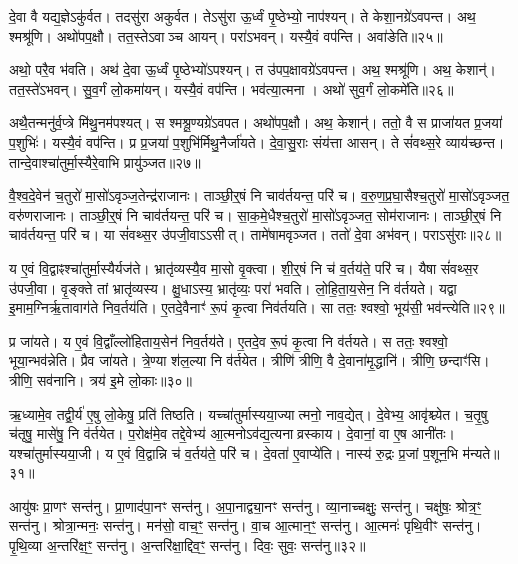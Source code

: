 दे॒वा वै यद्य॒ज्ञे\-ऽकु॑र्वत।
तदसु॑रा अकुर्वत।
तेऽसु॑रा ऊ॒र्ध्वं पृ॒ष्ठेभ्यो॒ नाप॑श्यन्।
ते केशा॒नग्रे॑\-ऽवपन्त।
अथ॒ श्मश्रू॑णि।
अथो॑पप॒क्षौ।
तत॒स्ते\-ऽवाञ्च आयन्।
परा॑ऽभवन्।
यस्यै॒वं वप॑न्ति।
अवा॑ङेति॥२५॥

अथो॒ परै॒व भ॑वति।
अथ॑ दे॒वा ऊ॒र्ध्वं पृ॒ष्ठेभ्यो॑\-ऽपश्यन्।
त उ॑पप॒क्षावग्रे॑\-ऽवपन्त।
अथ॒ श्मश्रू॑णि।
अथ॒ केशान्॑।
तत॒स्ते॑\-ऽभवन्।
सु॒व॒र्गं लो॒कमा॑यन्।
यस्यै॒वं वप॑न्ति।
भव॑त्या॒त्मना।
अथो॑ सुव॒र्गं लो॒कमे॑ति॥२६॥

अथै॒तन्मनु॑र्व॒प्त्रे मि॑थु॒नम॑पश्यत्।
स श्मश्रू॒ण्यग्रे॑ऽवपत।
अथो॑पप॒क्षौ।
अथ॒ केशान्॑।
ततो॒ वै स प्राजा॑यत प्र॒जया॑ प॒शुभिः॑।
यस्यै॒वं वप॑न्ति।
प्र प्र॒जया॑ प॒शुभि॑र्मिथु॒नैर्जा॑यते।
दे॒वा॒सु॒राः संय॑त्ता आसन्।
ते सं॑वथ्स॒रे व्याय॑च्छन्त।
तान्दे॒वाश्चा॑तुर्मा॒स्यैरे॒वाभि प्रायु॑ञ्जत॥२७॥

वै॒श्व॒दे॒वेन॑ च॒तुरो॑ मा॒सो॑\-ऽवृञ्ज॒तेन्द्र॑राजानः।
ताञ्छी॒र्॒षं नि चाव॑र्तयन्त॒ परि॑ च।
व॒रु॒ण॒प्र॒घा॒सैश्च॒तुरो॑ मा॒सो॑\-ऽवृञ्जत॒ वरु॑णराजानः।
ताञ्छी॒र्॒षं नि चाव॑र्तयन्त॒ परि॑ च।
सा॒क॒मे॒धैश्च॒तुरो॑ मा॒सो॑\-ऽवृञ्जत॒ सोम॑राजानः।
ताञ्छी॒र्॒षं नि चाव॑र्तयन्त॒ परि॑ च।
या सं॑वथ्स॒र उ॑पजी॒वा\-ऽऽसीत्।
तामे॑षामवृञ्जत।
ततो॑ दे॒वा अभ॑वन्।
पराऽसु॑राः॥२८॥

य ए॒वं वि॒द्वाꣴश्चा॑तुर्मा॒स्यैर्यज॑ते।
भ्रातृ॑व्यस्यै॒व मा॒सो वृ॒क्त्वा।
शी॒र्॒षं नि च॑ व॒र्तय॑ते॒ परि॑ च।
यैषा सं॑वथ्स॒र उ॑पजी॒वा।
वृ॒ङ्क्ते तां भ्रातृ॑व्यस्य।
क्षु॒धा\-ऽस्य॒ भ्रातृ॑व्यः॒ परा॑ भवति।
लो॒हि॒ता॒य॒सेन॒ नि व॑र्तयते।
यद्वा इ॒माम॒ग्निर्\mbox{}ऋ॒तावाग॑ते निव॒र्तय॑ति।
ए॒तदे॒वैनाꣳ॑ रू॒पं कृ॒त्वा निव॑र्तयति।
सा ततः॒ श्वश्वो॒ भूय॑सी॒ भव॑न्त्येति॥२९॥

प्र जा॑यते।
य ए॒वं वि॒द्वाँल्लो॑हिताय॒सेन॑ निव॒र्तय॑ते।
ए॒तदे॒व रू॒पं कृ॒त्वा नि व॑र्तयते।
स ततः॒ श्वश्वो॒ भूया॒न्भव॑न्नेति।
प्रैव जा॑यते।
त्रे॒ण्या श॑ल॒ल्या नि व॑र्तयेत।
त्रीणि॑ त्रीणि॒ वै दे॒वाना॑मृ॒द्धानि॑।
त्रीणि॒ छन्दाꣳ॑सि।
त्रीणि॒ सव॑नानि।
त्रय॑ इ॒मे लो॒काः॥३०॥

ऋ॒ध्यामे॒व तद्वी॒र्य॑ ए॒षु लो॒केषु॒ प्रति॑ तिष्ठति।
यच्चा॑तुर्मास्य\-या॒ज्यात्मनो॒ नाव॒द्येत्।
दे॒वेभ्य॒ आवृ॑श्च्येत।
च॒तृ॒षु च॑तृषु॒ मासे॑षु॒ नि व॑र्तयेत।
प॒रोक्ष॑मे॒व तद्दे॒वेभ्य॑ आ॒त्मनो\-ऽव॑द्य॒त्यना\-व्रस्काय।
दे॒वानां॒ वा ए॒ष आनी॑तः।
यश्चा॑तुर्मास्यया॒जी।
य ए॒वं वि॒द्वान्नि च॑ व॒र्तय॑ते॒ परि॑ च।
दे॒वता॑ ए॒वाप्ये॑ति।
नास्य॑ रु॒द्रः प्र॒जां प॒शून॒भि म॑न्यते॥३१॥\anuvakamend[ए॒त्ये॒त्य॒यु॒ञ्ज॒तासु॑रा एति लो॒का म॑न्यते]

आयु॑षः प्रा॒णꣳ सन्त॑नु।
प्रा॒णाद॑पा॒नꣳ सन्त॑नु।
अ॒पा॒नाद्व्या॒नꣳ सन्त॑नु।
व्या॒नाच्चक्षुः॒ सन्त॑नु।
चक्षु॑षः॒ श्रोत्र॒ꣳ॒ सन्त॑नु।
श्रोत्रा॒न्मनः॒ सन्त॑नु।
मन॑सो॒ वाच॒ꣳ॒ सन्त॑नु।
वा॒च आ॒त्मान॒ꣳ॒ सन्त॑नु।
आ॒त्मनः॑ पृथि॒वीꣳ सन्त॑नु।
पृ॒थि॒व्या अ॒न्तरि॑क्ष॒ꣳ॒ सन्त॑नु।
अ॒न्तरि॑क्षा॒द्दिव॒ꣳ॒ सन्त॑नु।
दिवः॒ सुवः॒ सन्त॑नु॥३२॥\anuvakamend[अ॒न्तरि॑क्ष॒ꣳ॒ सन्त॑नु॒ द्वे च॑]

